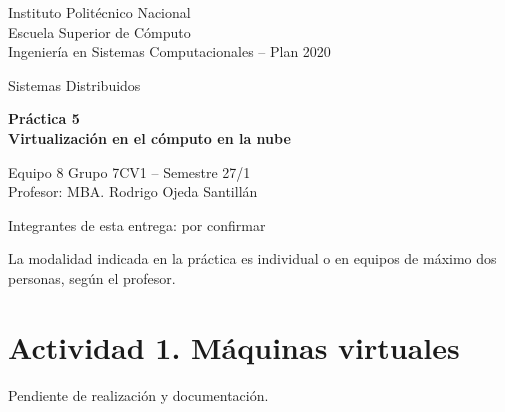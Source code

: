 \documentclass[11pt,letterpaper]{article}
\begin{document}
\begin{titlepage}
\centering
{\large Instituto Politécnico Nacional\\[0.4em]
Escuela Superior de Cómputo\\[0.4em]
Ingeniería en Sistemas Computacionales -- Plan 2020\par}
\vspace{2cm}
{\Large Sistemas Distribuidos\par}
\vspace{1cm}
{\LARGE\bfseries Práctica 5\\[0.3em]
Virtualización en el cómputo en la nube\par}
\vspace{2cm}
{\large Equipo 8 \quad Grupo 7CV1 -- Semestre 27/1\\[0.6em]
Profesor: MBA. Rodrigo Ojeda Santillán\par}
\vfill
{\large Integrantes de esta entrega: por confirmar\par}
\vspace{0.5cm}
{\small La modalidad indicada en la práctica es individual o en equipos de máximo dos personas, según el profesor.\par}
\end{titlepage}
\section{Actividad 1. Máquinas virtuales}
Pendiente de realización y documentación.


\end{document}
